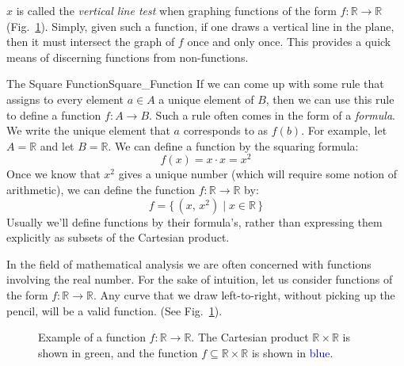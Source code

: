         $x$ is called the \textit{vertical line test} when graphing functions
        of the form $f:\mathbb{R}\rightarrow\mathbb{R}$
        (Fig.~\ref{fig:Function_R_to_R_Subset_Cart_Prod}). Simply, given such
        a function, if one draws a vertical line in the plane, then it must
        intersect the graph of $f$ once and only once. This provides a
        quick means of discerning functions from non-functions.
        \begin{lexample}{The Square Function}{Square_Function}
            If we can come up with some rule that assigns to every element
            $a\in{A}$ a unique element of $B$, then we can use this rule to
            define a function $f:A\rightarrow{B}$. Such a rule often comes
            in the form of a \textit{formula}. We write the unique element that
            $a$ corresponds to as $f(b)$. For example, let $A=\mathbb{R}$ and
            let $B=\mathbb{R}$. We can define a function by the squaring
            formula:
            \begin{equation}
                f(x)=x\cdot{x}=x^{2}
            \end{equation}
            Once we know that $x^{2}$ gives a unique number
            (which will require some notion of arithmetic), we can define
            the function $f:\mathbb{R}\rightarrow\mathbb{R}$ by:
            \begin{equation}
                f=\{\,(x,\,x^{2})\;|\;x\in\mathbb{R}\,\}
            \end{equation}
            Usually we'll define functions by their formula's, rather than
            expressing them explicitly as subsets of the Cartesian product.
        \end{lexample}
        In the field of mathematical analysis we are often concerned with
        functions involving the real number. For the sake of intuition, let
        us consider functions of the form $f:\mathbb{R}\rightarrow\mathbb{R}$.
        Any curve that we draw left-to-right, without picking up the pencil,
        will be a valid function.
        (See Fig.~\ref{fig:Function_R_to_R_Subset_Cart_Prod}).
        \begin{figure}[H]
            \centering
            
            \caption[Example of a Function
                     $f:\mathbb{R}\rightarrow\mathbb{R}$]
                    {Example of a function
                     $f:\mathbb{R}\rightarrow\mathbb{R}$.
                     The Cartesian product $\mathbb{R}\times\mathbb{R}$ is
                     shown in \textcolor{green!80!black}{green}, and the
                     function $f\subseteq\mathbb{R}\times\mathbb{R}$ is shown
                     in \textcolor{blue}{blue}.}
            \label{fig:Function_R_to_R_Subset_Cart_Prod}
        \end{figure}
